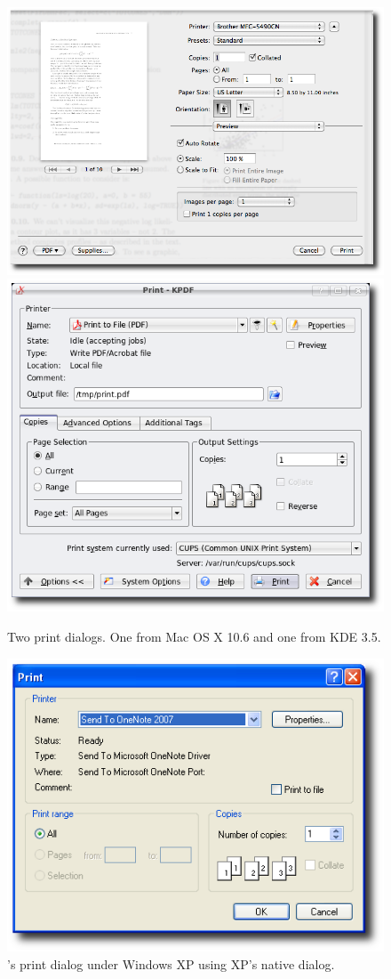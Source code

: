 \begin{figure}
  \centering
  \includegraphics[width=.75\textwidth]{fig-mac-print}
   \\
   
  \includegraphics[width=.75\textwidth]{kde-print}
  \caption{Two print dialogs. One from Mac OS X 10.6 and one from KDE 3.5.}
  \label{fig:GUI:print-dialogs}
\end{figure}


\begin{figure}
  \centering
  \includegraphics[width=.80\textwidth]{r-print-dialog}
  \caption{\R's print dialog under Windows XP using XP's native dialog.}
  \label{fig:GUI:print-dialogs-R}
\end{figure}

